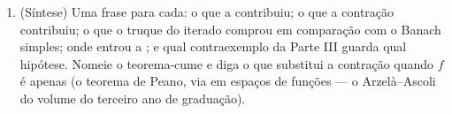 \begin{problem}
\begin{enumerate}[resume]
        num segmento $\intcc{A}{B}$, adapte a questão 8 para mostrar que
        a cota fatorial vale no segmento \emph{inteiro},
        de modo que existência e unicidade são globais aí --- o
        caso escalar do teorema de Cauchy--Lipschitz do~\cref{ch:b2:diffeq},
        sem restrição alguma sobre o comprimento $B - A$.
  \item (Síntese) Uma frase para cada: o que a 
        contribuiu; o que a contração contribuiu; o que o
        truque do iterado comprou em comparação com o Banach simples; onde entrou a
        ; e qual contraexemplo da Parte
        III guarda qual hipótese. Nomeie o teorema-cume
        e diga o que substitui a contração quando $f$ é apenas
         (o teorema de Peano, via  em espaços de
        funções --- o Arzelà--Ascoli do volume do terceiro ano de graduação).
\end{enumerate}
\end{problem}
